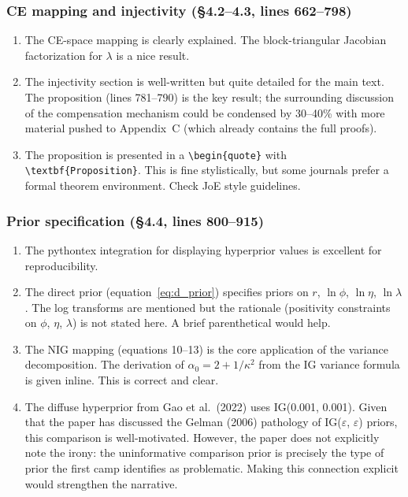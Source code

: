\documentclass[12pt,a4paper]{article}
\begin{document}
\subsubsection{CE mapping and injectivity (\S4.2--4.3, lines 662--798)}

\begin{enumerate}[label=(\alph*)]
  \item The CE-space mapping is clearly explained. The block-triangular Jacobian
    factorization for $\lambda$ is a nice result.
  \item The injectivity section is well-written but quite detailed for the main
    text. The proposition (lines 781--790) is the key result; the surrounding
    discussion of the compensation mechanism could be condensed by 30--40\%
    with more material pushed to Appendix~C (which already contains the full
    proofs).
  \item The proposition is presented in a \verb|\begin{quote}| with
    \verb|\textbf{Proposition}|. This is fine stylistically, but some journals
    prefer a formal theorem environment. Check JoE style guidelines.
\end{enumerate}

\subsubsection{Prior specification (\S4.4, lines 800--915)}

\begin{enumerate}[label=(\alph*)]
  \item The pythontex integration for displaying hyperprior values is excellent
    for reproducibility.
  \item The direct prior (equation~\ref{eq:d_prior}) specifies priors on
    $r$, $\ln\phi$, $\ln\eta$, $\ln\lambda$. The log transforms are mentioned
    but the rationale (positivity constraints on $\phi$, $\eta$, $\lambda$) is
    not stated here. A brief parenthetical would help.
  \item The NIG mapping (equations 10--13) is the core application of the
    variance decomposition. The derivation of $\alpha_0 = 2 + 1/\kappa^2$ from
    the IG variance formula is given inline. This is correct and clear.
  \item The diffuse hyperprior from Gao et al.\ (2022) uses
    IG(0.001, 0.001). Given that the paper has discussed the Gelman (2006)
    pathology of IG($\varepsilon$, $\varepsilon$) priors, this comparison is
    well-motivated. However, the paper does not explicitly note the irony: the
    uninformative comparison prior is precisely the type of prior the first camp
    identifies as problematic. Making this connection explicit would strengthen
    the narrative.
\end{enumerate}
\end{document}
